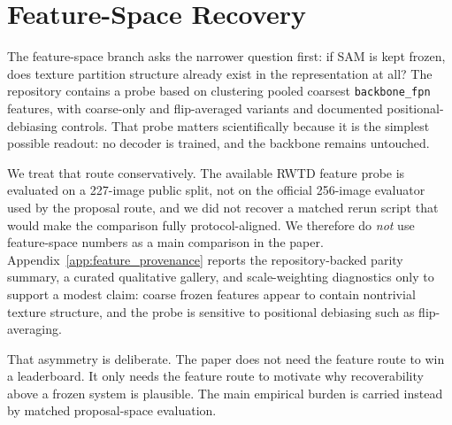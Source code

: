 \section{Feature-Space Recovery}
\label{sec:feature}

The feature-space branch asks the narrower question first: if SAM is kept frozen, does texture partition structure already exist in the representation at all? The repository contains a probe based on clustering pooled coarsest \texttt{backbone\_fpn} features, with coarse-only and flip-averaged variants and documented positional-debiasing controls. That probe matters scientifically because it is the simplest possible readout: no decoder is trained, and the backbone remains untouched.

We treat that route conservatively. The available RWTD feature probe is evaluated on a 227-image public split, not on the official 256-image evaluator used by the proposal route, and we did not recover a matched rerun script that would make the comparison fully protocol-aligned. We therefore do \emph{not} use feature-space numbers as a main comparison in the paper. Appendix~\ref{app:feature_provenance} reports the repository-backed parity summary, a curated qualitative gallery, and scale-weighting diagnostics only to support a modest claim: coarse frozen features appear to contain nontrivial texture structure, and the probe is sensitive to positional debiasing such as flip-averaging.

That asymmetry is deliberate. The paper does not need the feature route to win a leaderboard. It only needs the feature route to motivate why recoverability above a frozen system is plausible. The main empirical burden is carried instead by matched proposal-space evaluation.
